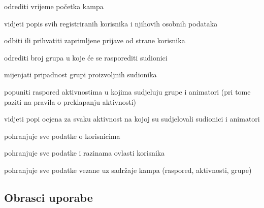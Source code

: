 \begin{packed_enum}
\begin{packed_enum}
	\end{packed_enum}
	\vspace{5mm} %

	\item  {}

	\begin{packed_enum}

		\item odrediti vrijeme početka kampa
		\item vidjeti popis svih registriranih korisnika i njihovih osobnih podataka
		\item odbiti ili prihvatiti zaprimljene prijave od strane korisnika
		\item odrediti broj grupa u koje će se rasporediti sudionici
		\item mijenjati pripadnost grupi proizvoljnih sudionika
		\item popuniti raspored aktivnostima u kojima sudjeluju grupe i animatori (pri tome paziti na pravila o preklapanju aktivnosti)
		\item vidjeti popi ocjena za svaku aktivnost na kojoj su sudjelovali sudionici i animatori

	\end{packed_enum}
	\vspace{5mm} %

	\item  {}

	\begin{packed_enum}

		\item pohranjuje sve podatke o korisnicima
		\item pohranjuje sve podatke i razinama ovlasti korisnika
		\item pohranjuje sve podatke vezane uz sadržaje kampa (raspored, aktivnosti, grupe)

	\end{packed_enum}
\end{packed_enum}



\eject



\subsection{Obrasci uporabe}
	\vspace{10mm} %




